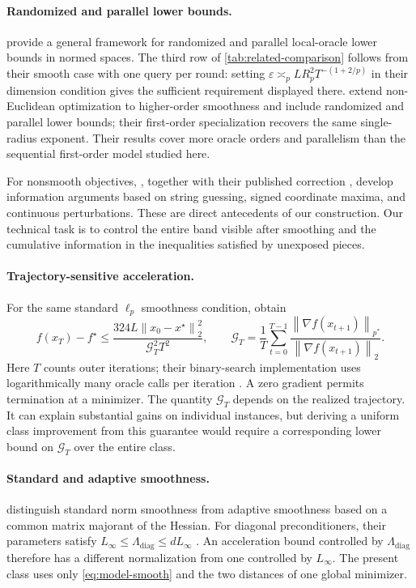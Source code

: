 \documentclass[11pt]{article}
\newcommand{\norm}[2]{\left\lVert #1\right\rVert_{#2}}
\newcommand{\eps}{\varepsilon}
\theoremstyle{definition}
\theoremstyle{remark}
\begin{document}
\paragraph{Randomized and parallel lower bounds.}
\citet{DiakonikolasGuzman2020} provide a general framework for
randomized and parallel local-oracle lower bounds in normed spaces.
The third row of \cref{tab:related-comparison} follows from their
smooth case with one query per round: setting
$\eps\asymp_p LR_p^2T^{-(1+2/p)}$ in their dimension condition gives
the sufficient requirement displayed there.
\citet{ContrerasGuzmanMartinezRubio2025} extend non-Euclidean
optimization to higher-order smoothness and include randomized and
parallel lower bounds; their first-order specialization recovers the
same single-radius exponent. Their results cover more oracle orders
and parallelism than the sequential first-order model studied here.

For nonsmooth objectives, \citet{BraunGuzmanPokutta2017}, together
with their published correction \citep{BraunGuzmanPokutta2024Correction},
develop information arguments based on string guessing, signed
coordinate maxima, and continuous perturbations. These are direct
antecedents of our construction. Our technical task is to control the
entire band visible after smoothing and the cumulative information in
the inequalities satisfied by unexposed pieces.

\paragraph{Trajectory-sensitive acceleration.}
For the same standard $\ell_p$ smoothness condition,
\citet[Theorem~4]{BaiBullins2025} obtain
\begin{equation}
\label{eq:intro-hasd}
 f(x_T)-f^\star\le
 \frac{324L\norm{x_0-x^\star}{2}^2}{\mathcal G_T^2T^2},
 \qquad
 \mathcal G_T=\frac1T\sum_{t=0}^{T-1}
 \frac{\norm{\nabla f(x_{t+1})}{p^*}}
      {\norm{\nabla f(x_{t+1})}{2}}.
\end{equation}
Here $T$ counts outer iterations; their binary-search implementation
uses logarithmically many oracle calls per iteration
\citep[Theorem~5]{BaiBullins2025}. A zero gradient permits termination
at a minimizer. The quantity $\mathcal G_T$ depends on the realized
trajectory. It can explain substantial gains on individual instances,
but deriving a uniform class improvement from this guarantee would
require a corresponding lower bound on $\mathcal G_T$ over the
entire class.

\paragraph{Standard and adaptive smoothness.}
\citet{XieWangWuLi2026} distinguish standard norm smoothness from
adaptive smoothness based on a common matrix majorant of the Hessian.
For diagonal preconditioners, their parameters satisfy
$L_\infty\le\Lambda_{\mathrm{diag}}\le dL_\infty$
\citep[Proposition~2.5]{XieWangWuLi2026}.
An acceleration bound controlled by $\Lambda_{\mathrm{diag}}$ therefore
has a different normalization from one controlled by $L_\infty$.
The present class uses only \cref{eq:model-smooth} and the two distances
of one global minimizer.
\end{document}
